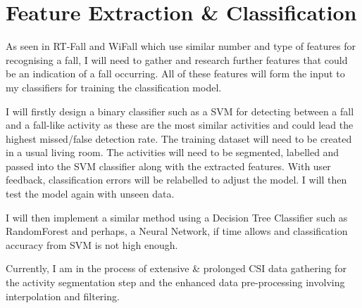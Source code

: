 \section{Feature Extraction \& Classification}
As seen in RT-Fall and WiFall which use similar number and type of features for recognising a fall, I will need to gather and research further features that could be an indication of a fall occurring. All of these features will form the input to my classifiers for training the classification model. \par
I will firstly design a binary classifier such as a SVM for detecting between a fall and a fall-like activity as these are the most similar activities and could lead the highest missed/false detection rate. The training dataset will need to be created in a usual living room. The activities will need to be segmented, labelled and passed into the SVM classifier along with the extracted features. With user feedback, classification errors will be relabelled to adjust the model. I will then test the model again with unseen data. \par 
I will then implement a similar method using a Decision Tree Classifier such as RandomForest and perhaps, a Neural Network, if time allows and classification accuracy from SVM is not high enough. 
\begin{comment}If I have enough time, I would like to investigate if the CSI.dat files are populated in real time and if there is a possibility of creating a Real Time system out of my work. \par \end{comment}
Currently, I am in the process of extensive \& prolonged CSI data gathering for the activity segmentation step and the enhanced data pre-processing involving interpolation and filtering. 